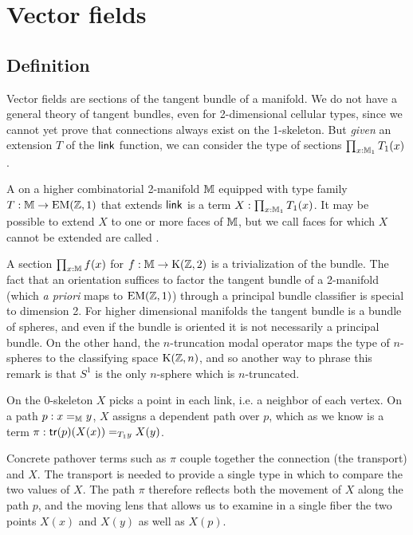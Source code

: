 \section{Vector fields}
\subsection{Definition}
Vector fields are sections of the tangent bundle of a manifold. We do not have a general theory of tangent bundles, even for 2-dimensional cellular types, since we cannot yet prove that connections always exist on the 1-skeleton. But \emph{given} an extension \( T \) of the \( \operatorname{\mathsf{link}} \) function, we can consider the type of sections \( \prod_{x:\mathbb{M}_1}T_1(x) \).

\begin{mydef}
A  on a higher combinatorial 2-manifold \( \mathbb{M} \) equipped with type family \( T:\mathbb{M}\to\mathrm{EM}(\mathbb{Z},1) \) that extends \( \operatorname{\mathsf{link}} \) is a term \( X:\prod_{x:\mathbb{M}_1}T_1(x) \). It may be possible to extend \( X \) to one or more faces of \( \mathbb{M} \), but we call faces for which \( X \) cannot be extended are called .
\end{mydef}

\begin{mynote}
A section \( \prod_{x:\mathbb{M}}f(x) \) for \( f:\mathbb{M}\to\mathrm{K}(\mathbb{Z},2) \) is a trivialization of the bundle. The fact that an orientation suffices to factor the tangent bundle of a 2-manifold (which \emph{a priori} maps to \( \mathrm{EM}(\mathbb{Z},1) \)) through a principal bundle classifier is special to dimension 2. For higher dimensional manifolds the tangent bundle is a bundle of spheres, and even if the bundle is oriented it is not necessarily a principal bundle. On the other hand, the \( n \)-truncation modal operator maps the type of \( n \)-spheres to the classifying space \( \mathrm{K}(\mathbb{Z},n) \), and so another way to phrase this remark is that \( S^1 \) is the only \( n \)-sphere which is \( n \)-truncated.
\end{mynote}

On the 0-skeleton \( X \) picks a point in each link, i.e. a neighbor of each vertex. On a path \( p:x=_{\mathbb{M}} y \), \( X \) assigns a dependent path over \( p \), which as we know is a term \( \pi:\mathsf{tr}(p)(X(x))=_{T_1 y} X(y) \).

\begin{mynote}Concrete pathover terms such as \( \pi \) couple together the connection (the transport) and \( X \). The transport is needed to provide a single type in which to compare the two values of \( X \). The path \( \pi \) therefore reflects both the movement of \( X \) along the path \( p \), and the moving lens that allows us to examine in a single fiber the two points \( X(x) \) and \( X(y) \) as well as \( X(p) \).\end{mynote}

